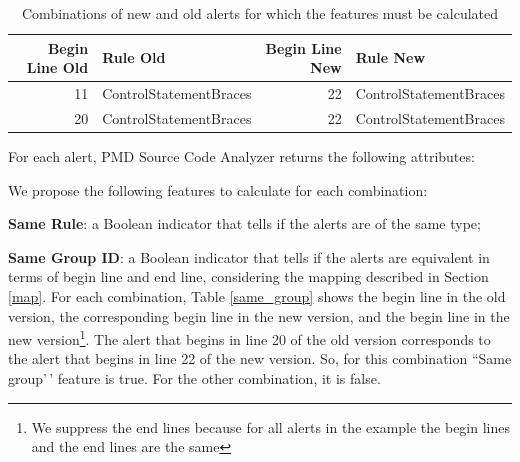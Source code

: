 \documentclass[
]{article}
\begin{document}
\small

\begin{table}[H]

\caption{\label{tab:unnamed-chunk-6}Combinations of new and old alerts for which the features must be calculated \label{combination}}
\centering
\begin{tabular}[t]{r|l|r|l}
\hline
Begin Line Old & Rule Old & Begin Line New & Rule New\\
\hline
11 & ControlStatementBraces & 22 & ControlStatementBraces\\
\hline
20 & ControlStatementBraces & 22 & ControlStatementBraces\\
\hline
\end{tabular}
\end{table}

\normalsize

\vspace{16pt}

For each alert, PMD Source Code Analyzer returns the following
attributes:

\vspace{16pt}

We propose the following features to calculate for each combination:

\textbf{Same Rule}: a Boolean indicator that tells if the alerts are of
the same type;

\textbf{Same Group ID}: a Boolean indicator that tells if the alerts are
equivalent in terms of begin line and end line, considering the mapping
described in Section \ref{map}. For each combination, Table
\ref{same_group} shows the begin line in the old version, the
corresponding begin line in the new version, and the begin line in the
new
version\footnote{We suppress the end lines because for all alerts in the 
example the begin lines and the end lines are the same}. The alert that
begins in line 20 of the old version corresponds to the alert that
begins in line 22 of the new version. So, for this combination ``Same
group'\,' feature is true. For the other combination, it is false.

\small

\begin{table}[H]

\caption{\label{tab:unnamed-chunk-7}Same group feature \label{same_group}}
\centering
{}
\end{table}
\end{document}
